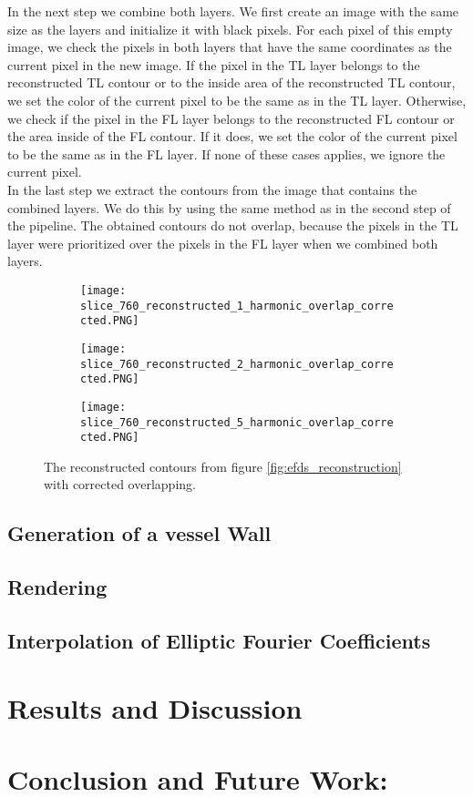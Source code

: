 \documentclass[thesis.tex]{subfiles}
\begin{document}
In the next step we combine both layers. We first create an image with the same size as the layers and initialize it with black pixels. For each pixel of this empty image, we check the pixels in both layers that have the same coordinates as the current pixel in the new image. If the pixel in the TL layer belongs to the reconstructed TL contour or to the inside area of the reconstructed TL contour, we set the color of the current pixel to be the same as in the TL layer. Otherwise, we check if the pixel in the FL layer belongs to the reconstructed FL contour or the area inside of the FL contour. If it does, we set the color of the current pixel to be the same as in the FL layer. If none of these cases applies, we ignore the current pixel.\\
In the last step we extract the contours from the image that contains the combined layers. We do this by using the same method as in the second step of the pipeline. The obtained contours do not overlap, because the pixels in the TL layer were prioritized over the pixels in the FL layer when we combined both layers.     

\begin{figure}
	\begin{subfigure}[t]{0.45\textwidth}
		\texttt{[image: slice\_760\_reconstructed\_1\_harmonic\_overlap\_corrected.PNG]}
	\caption{}		
	\end{subfigure}
\hspace{0.05\textwidth}
	\begin{subfigure}[t]{0.45\textwidth}
		\texttt{[image: slice\_760\_reconstructed\_2\_harmonic\_overlap\_corrected.PNG]}		
\caption{}	
	\end{subfigure}
\centering
\begin{subfigure}[t]{0.45\textwidth}
		\texttt{[image: slice\_760\_reconstructed\_5\_harmonic\_overlap\_corrected.PNG]}		
\caption{}	
	\end{subfigure}
	\caption{The reconstructed contours from figure \ref{fig:efds_reconstruction} with corrected overlapping.}
\label{fig:obliqueslices}
\end{figure}   

\section{Generation of a vessel Wall}

\section{Rendering}

\section{Interpolation of Elliptic Fourier Coefficients}

\chapter{Results and Discussion}\label{chap:basics}

\chapter{Conclusion and Future Work:}\label{chap:basics}

\subfilebib %
\end{document}
